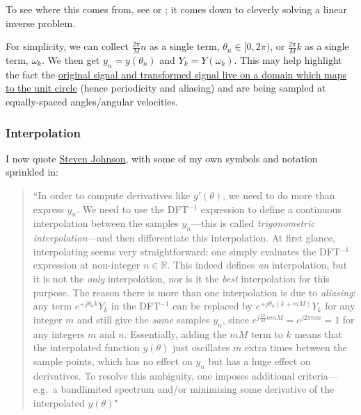 \documentclass[10pt]{article}
\begin{document}
To see where this comes from, see \cite{oppenheim} or \cite{bretherton}; it comes down to cleverly solving a linear inverse problem.\newline

For simplicity, we can collect $\frac{2\pi}{M}n$ as a single term, $\theta_n \in [0, 2\pi)$, or $\frac{2\pi}{M}k$ as a single term, $\omega_k$. We then get $y_n = y(\theta_n)$ and $Y_k = Y(\omega_k)$. This may help highlight the fact the \href{https://dsp.stackexchange.com/a/18931/40873}{original signal and transformed signal live on a domain which maps to the unit circle}\cite{bristow} (hence periodicity and aliasing) and are being sampled at equally-spaced angles/angular velocities.

\subsubsection{Interpolation}

I now quote \href{https://math.mit.edu/~stevenj/fft-deriv.pdf}{Steven Johnson}\cite{johnson}, with some of my own symbols and notation sprinkled in:

\begin{quotation}
``In order to compute derivatives like $y'(\theta)$, we need to do more than express $y_n$. We need to use the DFT$^{-1}$ expression to define a continuous interpolation between the samples $y_n$---this is called \textit{trigonometric interpolation}---and then differentiate this interpolation. At first glance, interpolating seems very straightforward: one simply evaluates the DFT$^{-1}$ expression at non-integer $n \in \mathbb{R}$. This indeed defines \textit{an} interpolation, but it is not the \textit{only} interpolation, nor is it the \textit{best} interpolation for this purpose. The reason there is more than one interpolation is due to \textit{aliasing}: any term $e^{+j \theta_n k} Y_k$ in the DFT$^{-1}$ can be replaced by $e^{+j \theta_n (k + mM)} Y_k$ for any integer $m$ and still give the \textit{same} samples $y_n$, since $e^{j \frac{2\pi}{M} nmM} = e^{j2\pi nm} = 1$ for any integers $m$ and $n$. Essentially, adding the $mM$ term to $k$ means that the interpolated function $y(\theta)$ just oscillates $m$ extra times between the sample points, which has no effect on $y_n$ but has a huge effect on derivatives. To resolve this ambiguity, one imposes additional criteria---e.g.~a bandlimited spectrum and/or minimizing some derivative of the interpolated $y(\theta)$"
\end{quotation}
\end{document}

